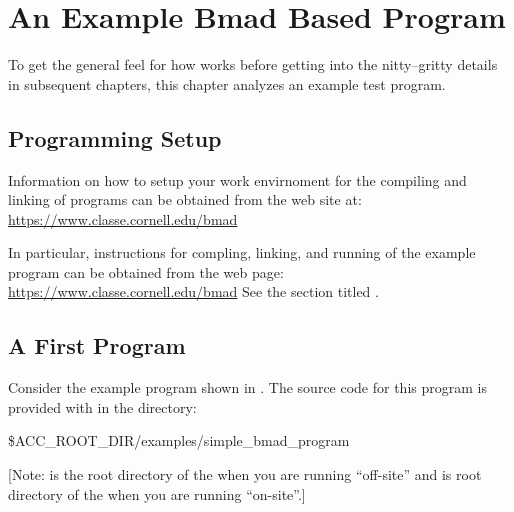 \chapter{An Example Bmad Based Program}
\label{c:program.info}

To get the general feel for how \bmad works before getting into the nitty--gritty details in
subsequent chapters, this chapter analyzes an example test program.

\section{Programming Setup}
\label{s:prog.setup}

Information on how to setup your work envirnoment for the compiling and linking of programs can be
obtained from the \bmad web site at:
\hfill\break
\hspace*{0.3in}
\url{https://www.classe.cornell.edu/bmad}

In particular, instructions for compling, linking, and running of the example program can be
obtained from the web page: 
\hfill\break 
\hspace*{0.3in}
\url{https://www.classe.cornell.edu/bmad} 
\hfill\break 
See the section titled .

\section{A First Program}
\label{s:first.program}

Consider the example program shown in . The source code for this program is provided
with \bmad in the directory:
\begin{example}
  \$ACC_ROOT_DIR/examples/simple_bmad_program
\end{example}
[Note:  is the root directory of the \bmad {} when you are running
``off-site'' and is root directory of the  when you are running ``on-site''.]

